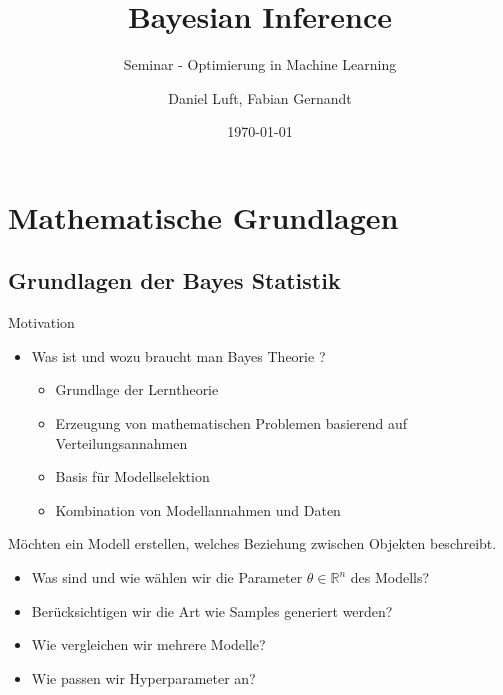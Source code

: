 \documentclass{beamer}
\title[Bayesian Inference]{Bayesian Inference}
\subtitle{Seminar - Optimierung in Machine Learning}
\author{Daniel Luft, Fabian Gernandt}
\date{\today}
\begin{document}
{
\frame{\titlepage}
\newcommand{\labelitemi}{$\bullet$}
\newcommand{\labelitemii}{$\rightarrow$}

\section{Mathematische Grundlagen}

\frame{\tableofcontents[currentsection,subsectionstyle=show/shaded,hideothersubsections]}

\subsection{Grundlagen der Bayes Statistik}


\begin{frame}{Motivation}
	\begin{itemize}
		\item Was ist und wozu braucht man Bayes Theorie ?
		\begin{itemize}
			\pause \item Grundlage der Lerntheorie
			\pause \item Erzeugung von mathematischen Problemen basierend auf Verteilungsannahmen
			\pause \item Basis für Modellselektion
			\pause \item Kombination von Modellannahmen und Daten
		\end{itemize}
	\end{itemize}
\end{frame}


\begin{frame}
Möchten ein Modell erstellen, welches Beziehung zwischen Objekten beschreibt.

\begin{itemize}
\item Was sind und wie wählen wir die Parameter $\theta \in \mathbb{R}^n$ des Modells?
\item Berücksichtigen wir die Art wie Samples generiert werden?
\item Wie vergleichen wir mehrere Modelle?
\item Wie passen wir Hyperparameter an?
\end{itemize}
 

\end{frame}}
\end{document}
